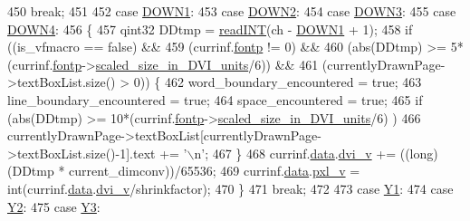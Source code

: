 \begin{DoxyCode}
{450           \textcolor{keywordflow}{break};
451 
452         \textcolor{keywordflow}{case} \hyperlink{dvi_8h_ac3e42a3105743a7cf304f127557cada1}{DOWN1}:
453         \textcolor{keywordflow}{case} \hyperlink{dvi_8h_ab0c102b2b7a73672ed538075f6af42db}{DOWN2}:
454         \textcolor{keywordflow}{case} \hyperlink{dvi_8h_a49d9d799c7b97517e59c5475a59e0024}{DOWN3}:
455         \textcolor{keywordflow}{case} \hyperlink{dvi_8h_a123df89f73f36968321df890744cf87a}{DOWN4}:
456           \{
457             qint32 DDtmp = \hyperlink{classbigEndianByteReader_ad85cb1f2cce7f4de7abc632b5e95223b}{readINT}(ch - \hyperlink{dvi_8h_ac3e42a3105743a7cf304f127557cada1}{DOWN1} + 1);
458             \textcolor{keywordflow}{if} ((is\_vfmacro == \textcolor{keyword}{false}) &&
459                 (currinf.\hyperlink{structdrawinf_a4a6ec248b5b071099ddf9b5e4f0255e2}{fontp} != 0) &&
460                 (abs(DDtmp) >= 5*(currinf.\hyperlink{structdrawinf_a4a6ec248b5b071099ddf9b5e4f0255e2}{fontp}->\hyperlink{classTeXFontDefinition_a8514a1b74d448c5e9e9dafc8737938e9}{scaled\_size\_in\_DVI\_units}/6)) 
      &&
461                 (currentlyDrawnPage->textBoxList.size() > 0)) \{
462               word\_boundary\_encountered = \textcolor{keyword}{true};
463               line\_boundary\_encountered = \textcolor{keyword}{true};
464               space\_encountered = \textcolor{keyword}{true};
465               \textcolor{keywordflow}{if} (abs(DDtmp) >= 10*(currinf.\hyperlink{structdrawinf_a4a6ec248b5b071099ddf9b5e4f0255e2}{fontp}->\hyperlink{classTeXFontDefinition_a8514a1b74d448c5e9e9dafc8737938e9}{scaled\_size\_in\_DVI\_units}/6)
      )
466                 currentlyDrawnPage->textBoxList[currentlyDrawnPage->textBoxList.size()-1].text += \textcolor{charliteral}{'\(\backslash\)n'};
467             \}
468             currinf.\hyperlink{structdrawinf_af73f66288002f0a25c7843a534bf1340}{data}.\hyperlink{structframedata_a9497085c5712ee20cc25eaa37ea902b6}{dvi\_v} += ((long) (DDtmp *  current\_dimconv))/65536;
469             currinf.\hyperlink{structdrawinf_af73f66288002f0a25c7843a534bf1340}{data}.\hyperlink{structframedata_a0e7316fa88b0240baa7ce526650131a9}{pxl\_v}  = int(currinf.\hyperlink{structdrawinf_af73f66288002f0a25c7843a534bf1340}{data}.\hyperlink{structframedata_a9497085c5712ee20cc25eaa37ea902b6}{dvi\_v}/shrinkfactor);
470           \}
471           \textcolor{keywordflow}{break};
472 
473         \textcolor{keywordflow}{case} \hyperlink{dvi_8h_a294189cdea31dda8faf609b9b3e2000a}{Y1}:
474         \textcolor{keywordflow}{case} \hyperlink{dvi_8h_a3128cc29e366777d66d8b049451ca8a0}{Y2}:
475         \textcolor{keywordflow}{case} \hyperlink{dvi_8h_a676acf01638364a90adf5d09d2a215bf}{Y3}:
}
\end{DoxyCode}
